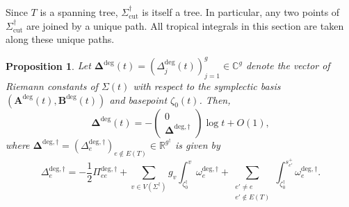 \documentclass[12pt]{amsart}
\numberwithin{equation}{section}
\newtheorem{proposition}[theorem]{Proposition}
\theoremstyle{definition}
\newcommand{\C}{\mathbb{C}}
\newcommand{\R}{\mathbb{R}}
\def\vertices{V}
\def\edges{E}
\def\trop{\dagger}
\def\vecRC{\bm{\Delta}}
\def\RC{{\Delta}}
\def\ptSig{\zeta}
\def\basept{{\ptSig_0}}
\def\baseptT{{\ptSig_0^\trop}}
\def\mcurve{\Sigma}
\def\tropmcurve{\mcurve^\trop}
\begin{document}
Since $T$ is a spanning tree,
$\tropmcurve_{\mathrm{cut}}$ is itself a tree. In particular, any two points of
$\tropmcurve_{\mathrm{cut}}$ are joined by a unique path. All tropical
integrals in this section are taken along these unique paths.


\begin{proposition}
\label{prop:riemann_constants_trop}
Let
$
\vecRC^{\mathrm{deg}}(t)
=
(\RC_j^{\mathrm{deg}}(t))_{j=1}^g
\in\C^g
$
denote the vector of Riemann constants of $\mcurve(t)$ with respect to
the symplectic basis
$
(
\bm A^{\mathrm{deg}}(t),
\bm B^{\mathrm{deg}}(t)
)
$
and basepoint $\basept(t)$. Then,
\[
\vecRC^{\mathrm{deg}}(t)
=
-
\begin{pmatrix}
0\\
\vecRC^{\mathrm{deg},\trop}
\end{pmatrix}
\log t
+
O(1),
\]
where
$
\vecRC^{\mathrm{deg},\trop}
=
(
\RC_e^{\mathrm{deg},\trop}
)_{e\notin\edges(T)}
\in
\R^{g^\trop}
$
is given by
\begin{equation}
\label{eq:RC_deg_trop}
\RC_e^{\mathrm{deg},\trop}
=
-\frac{1}{2}\Pi_{ee}^{\mathrm{deg},\trop}
+
\sum_{v\in\vertices(\tropmcurve)}
g_v
\int_{\baseptT}^{v}
\omega_e^{\mathrm{deg},\trop}
+
\sum_{\substack{
e'\neq e\\
e'\notin\edges(T)
}}
\int_{\baseptT}^{s_{e'}^+}
\omega_e^{\mathrm{deg},\trop}.
\end{equation}
\end{proposition}
\end{document}
